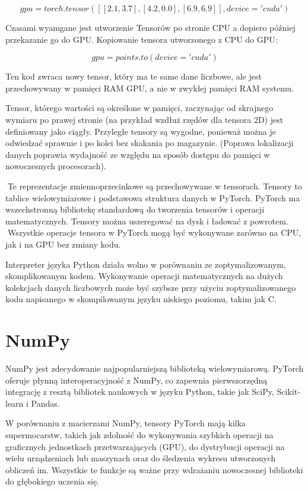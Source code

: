 \documentclass[brudnopis]{xmgr}
\begin{document}
\begin{equation}
gpu = torch.tensor([[2.1, 3.7], [4.2, 0.0], [6.9, 6.9]], device='cuda')
\end{equation}

Czasami wyamgane jest utworzenie Tensorów po stronie CPU a dopiero później przekazanie go do GPU. Kopiowanie tensora utworzonego z CPU do GPU:

\begin{equation}
gpu = points.to(device='cuda')
\end{equation}


Ten kod zwraca nowy tensor, który ma te same dane liczbowe, ale jest przechowywany w pamięci RAM GPU, a nie w zwykłej pamięci RAM systemu.

Tensor, którego wartości są określone w pamięci, zaczynając od skrajnego wymiaru po prawej stronie (na przykład wzdłuż rzędów dla tensora 2D) jest definiowany jako ciągły. Przyległe tensory są wygodne, ponieważ można je odwiedzać sprawnie i po kolei bez skakania po magazynie. (Poprawa lokalizacji danych poprawia wydajność ze względu na sposób dostępu do pamięci w nowoczesnych procesorach).

􏰹Te reprezentacje zmiennoprzecinkowe są przechowywane w tensorach. Tensory to tablice wielowymiarowe i podstawowa struktura danych w PyTorch. PyTorch ma wszechstronną bibliotekę standardową do tworzenia tensorów i operacji matematycznych. Tensory można uszeregować na dysk i ładować z powrotem.
􏰹Wszystkie operacje tensora w PyTorch mogą być wykonywane zarówno na CPU, jak i na GPU bez zmiany kodu.

Interpreter języka Python działa wolno w porównaniu ze zoptymalizowanym, skomplikowanym kodem. Wykonywanie operacji matematycznych na dużych kolekcjach danych liczbowych może być szybsze przy użyciu zoptymalizowanego kodu napisanego w skompilowanym języku niskiego poziomu, takim jak C.

    \section{NumPy\label{s:dsssl}}
    
    NumPy jest zdecydowanie najpopularniejszą biblioteką wielowymiarową. PyTorch oferuje płynną interoperacyjność z NumPy, co zapewnia pierwszorzędną integrację z resztą bibliotek naukowych w języku Python, takie jak SciPy, Scikit-learn i Pandas.

W porównaniu z macierzami NumPy, tensory PyTorch mają kilka supermocarstw, takich jak zdolność do wykonywania szybkich operacji na graficznych jednostkach przetwarzających (GPU), do dystrybucji operacji na wielu urządzeniach lub maszynach oraz do śledzenia wykresu utworzonych obliczeń im. Wszystkie te funkcje są ważne przy wdrażaniu nowoczesnej biblioteki do głębokiego uczenia się.
\end{document}
